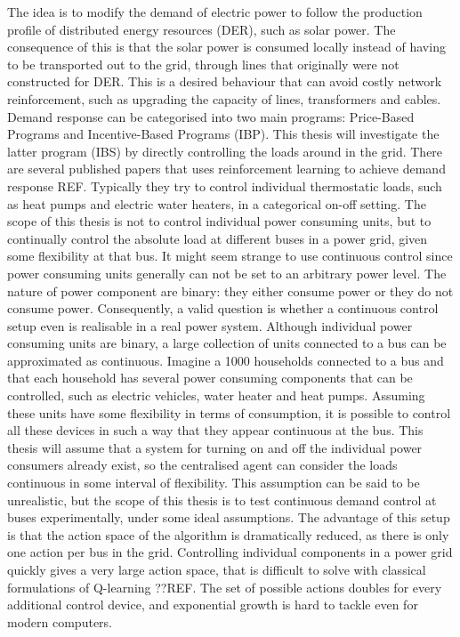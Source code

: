 \documentclass[class=book, crop=false]{standalone}
\begin{document}
The idea is to modify the demand of electric power to follow the production profile of distributed energy resources (DER), such as solar power. The consequence of this is that the solar power is consumed locally instead of having to be transported out to the grid, through lines that originally were not constructed for DER. This is a desired behaviour that can avoid costly network reinforcement, such as upgrading the capacity of lines, transformers and cables\cite{active_network_management}. Demand response can be categorised into two main programs: Price-Based Programs and Incentive-Based Programs (IBP)\cite{demand_response_definition}. This thesis will investigate the latter program (IBS) by directly controlling the loads around in the grid. There are several published papers that uses reinforcement learning to achieve demand response REF\cite{thermo_q_learning}. Typically they try to control individual thermostatic loads, such as heat pumps and electric water heaters, in a categorical on-off setting. The scope of this thesis is not to control individual power consuming units, but to continually control the absolute load at different buses in a power grid, given some flexibility at that bus. It might seem strange to use continuous control since power consuming units generally can not be set to an arbitrary power level. The nature of power component are binary: they either consume power or they do not consume power. Consequently, a valid question is whether a continuous control setup even is realisable in a real power system. Although individual power consuming units are binary, a large collection of units connected to a bus can be approximated as continuous. Imagine a 1000 households connected to a bus and that each household has several power consuming components that can be controlled, such as electric vehicles, water heater and heat pumps. Assuming these units have some flexibility in terms of consumption, it is possible to control all these devices in such a way that they appear continuous at the bus. This thesis will assume that a system for turning on and off the individual power consumers already exist, so the centralised agent can consider the loads continuous in some interval of flexibility. This assumption can be said to be unrealistic, but the scope of this thesis is to test continuous demand control at buses experimentally, under some ideal assumptions. The advantage of this setup is that the action space of the algorithm is dramatically reduced, as there is only one action per bus in the grid. Controlling individual components in a power grid quickly gives a very large action space, that is difficult to solve with classical formulations of Q-learning ??REF. The set of possible actions doubles for every additional control device, and exponential growth is hard to tackle even for modern computers.
\end{document}
